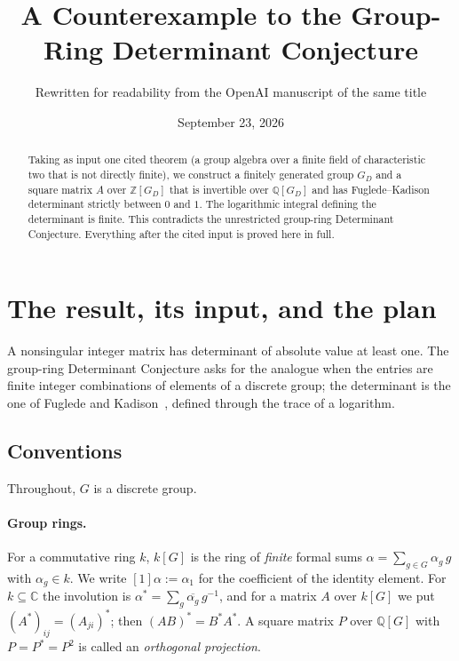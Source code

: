 \documentclass[11pt]{article}
\title{A Counterexample to the Group-Ring Determinant Conjecture}
\author{Rewritten for readability from the OpenAI manuscript of the same title}
\date{September 23, 2026}
\theoremstyle{remark}
\numberwithin{equation}{section}
\newcommand{\Z}{\mathbb Z}
\newcommand{\Q}{\mathbb Q}
\newcommand{\C}{\mathbb C}
\begin{document}
\maketitle
\begin{abstract}
Taking as input one cited theorem (a group algebra over a finite field of characteristic two that is not directly finite), we construct a finitely generated group $G_D$ and a square matrix $A$ over $\Z[G_D]$ that is invertible over $\Q[G_D]$ and has Fuglede--Kadison determinant strictly between $0$ and $1$. The logarithmic integral defining the determinant is finite. This contradicts the unrestricted group-ring Determinant Conjecture. Everything after the cited input is proved here in full.
\end{abstract}

\section{The result, its input, and the plan}
\label{sec:introduction}

A nonsingular integer matrix has determinant of absolute value at least one. The group-ring Determinant Conjecture asks for the analogue when the entries are finite integer combinations of elements of a discrete group; the determinant is the one of Fuglede and Kadison~\cite{FK1952}, defined through the trace of a logarithm.

\subsection{Conventions}
\label{subsec:conventions}

Throughout, $G$ is a discrete group.

\paragraph{Group rings.}
For a commutative ring $k$, $k[G]$ is the ring of \emph{finite} formal sums $\alpha=\sum_{g\in G}\alpha_g\,g$ with $\alpha_g\in k$. We write $[1]\alpha:=\alpha_1$ for the coefficient of the identity element. For $k\subseteq\C$ the involution is $\alpha^*=\sum_g\overline{\alpha_g}\,g^{-1}$, and for a matrix $A$ over $k[G]$ we put $(A^*)_{ij}=(A_{ji})^*$; then $(AB)^*=B^*A^*$. A square matrix $P$ over $\Q[G]$ with $P=P^*=P^2$ is called an \emph{orthogonal projection}.
\end{document}
